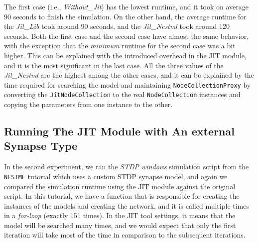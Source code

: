 The first case (i.e., \emph{Without\_Jit}) has the lowest runtime, and it took on average  90 seconds to finish the simulation. On the other hand, the average runtime for the \emph{Jit\_Lib} took around 90 seconds, and the \emph{Jit\_Nestml} took around 120 seconds.  Both the first case and the second case have almost the same behavior, with the exception that the \emph{minimum} runtime for the second case was a bit higher. This can be explained with the introduced overhead in the JIT module, and it is the most significant in the last case. All the three values of the \emph{Jit\_Nestml} are the highest among the other cases, and it can be explained by the time required for searching the model and maintaining \texttt{NodeCollectionProxy} by converting the \texttt{JitNodeCollection} to the real \texttt{NodeCollection} instances and copying the parameters from one instance to the other.


\subsection*{Running The JIT Module with An external Synapse Type}

In the second experiment, we ran the \emph{STDP windows} simulation script from the \texttt{NESTML} tutorial which uses a custom STDP synapse model, and again we compared the simulation runtime using the JIT module against the original script. In this tutorial, we have a function that is responsible for creating the instances of the models and creating the network, and it is called multiple times in a \emph{for-loop} (exactly 151 times). In the JIT tool settings, it means that the model will be searched many times, and we would expect that only the first iteration will take most of the time in comparison to the subsequent iterations. 

